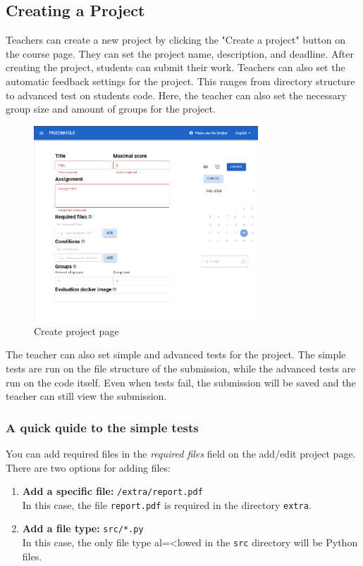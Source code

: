 \documentclass{article}
\begin{document}
\subsection{Creating a Project}
Teachers can create a new project by clicking the "Create a project" button on the course page. They can set the project name, description, and deadline. After creating the project, students can submit their work.
Teachers can also set the automatic feedback settings for the project. This ranges from directory structure to advanced test on students code. 
Here, the teacher can also set the necessary group size and amount of groups for the project.

\begin{figure}[H]
    \centering
    \includegraphics[width=0.75\textwidth]{images/createproject.png}
    \caption{Create project page}
\end{figure}

The teacher can also set simple and advanced tests for the project. The simple tests are run on the file structure of the submission, while the advanced tests are run on the code itself. Even when tests fail, the submission will be saved and the teacher can still view the submission.

\subsubsection{A quick quide to the simple tests}

You can add required files in the \textit{required files} field on the add/edit project page.
There are two options for adding files:

\begin{enumerate}[label=\arabic*.]
    \item \textbf{Add a specific file:} \texttt{/extra/report.pdf}\\
    In this case, the file \texttt{report.pdf} is required in the directory \texttt{extra}.
    
    \item \textbf{Add a file type:} \texttt{src/*.py}\\
    In this case, the only file type al=<lowed in the \texttt{src} directory will be Python files.
\end{enumerate}
\end{document}
